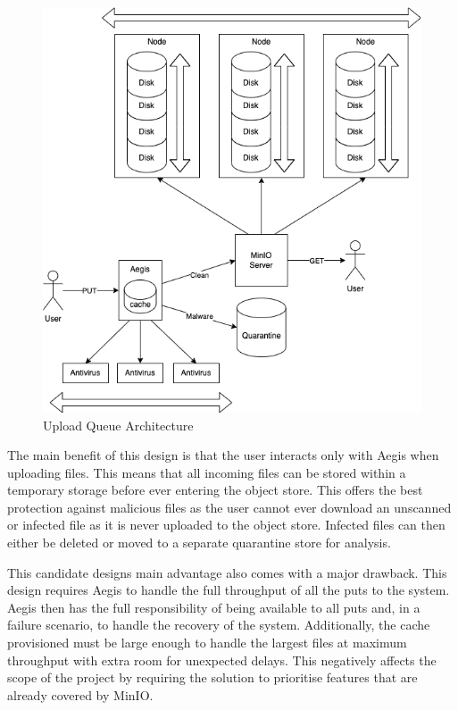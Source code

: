 \documentclass[12pt, conference, final, a4paper, onecolumn, compsoc]{IEEEtran}
\begin{document}
\begin{figure}
  \centering \includegraphics[scale=.4]{diagrams/upload-queue.png}
  \caption{Upload Queue Architecture}
  \label{fig:uploadQueueArch}
\end{figure}

The main benefit of this design is that the user interacts only with Aegis when
uploading files. This means that all incoming files can be stored within a
temporary storage before ever entering the object store. This offers the best
protection against malicious files as the user cannot ever download an unscanned
or infected file as it is never uploaded to the object store. Infected files can
then either be deleted or moved to a separate quarantine store for analysis.

This candidate designs main advantage also comes with a major drawback. This
design requires Aegis to handle the full throughput of all the puts to the
system. Aegis then has the full responsibility of being available to all puts
and, in a failure scenario, to handle the recovery of the system. Additionally,
the cache provisioned must be large enough to handle the largest files at
maximum throughput with extra room for unexpected delays. This negatively
affects the scope of the project by requiring the solution to prioritise
features that are already covered by MinIO.
\end{document}
